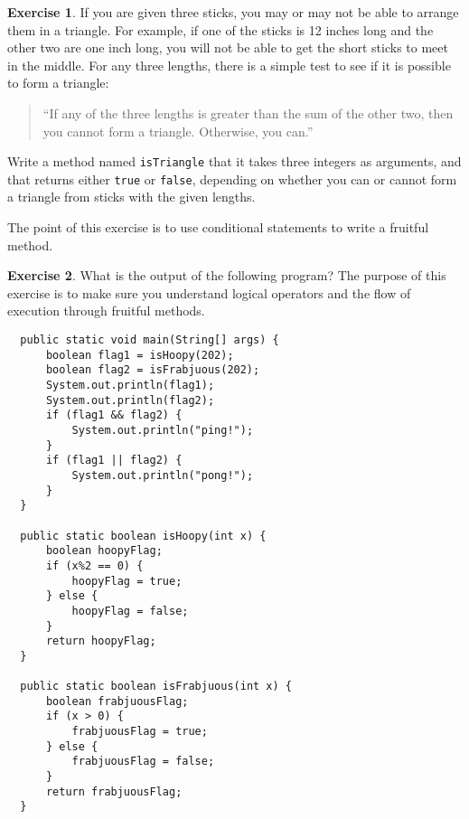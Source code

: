 \documentclass[12pt]{book}
\theoremstyle{definition}
\newtheorem{excz}{Exercise}[chapter]
\newenvironment{exercise}{\bigskip\begin{excz}\mbox{}}{\end{excz}}
\begin{document}
\begin{exercise}
If you are given three sticks, you may or may not be able to arrange
them in a triangle.  For example, if one of the sticks is 12 inches
long and the other two are one inch long, you will
not be able to get the short sticks to meet in the middle.  For any
three lengths, there is a simple test to see if it is possible to form
a triangle:

\begin{quotation}
``If any of the three lengths is greater than the sum of the other two,
then you cannot form a triangle.  Otherwise, you can.''
\end{quotation}

Write a method named {\tt isTriangle} that it takes three integers as
arguments, and that returns either {\tt true} or {\tt false},
depending on whether you can or cannot form a triangle from sticks
with the given lengths.

The point of this exercise is to use conditional statements to
write a fruitful method.

\end{exercise}


\begin{exercise}
What is the output of the following program?  The purpose of
this exercise is to make sure you understand logical operators
and the flow of execution through fruitful methods.

\begin{lstlisting}
  public static void main(String[] args) {
      boolean flag1 = isHoopy(202);
      boolean flag2 = isFrabjuous(202);
      System.out.println(flag1);
      System.out.println(flag2);
      if (flag1 && flag2) {
          System.out.println("ping!");
      }
      if (flag1 || flag2) {
          System.out.println("pong!");
      }
  }

  public static boolean isHoopy(int x) {
      boolean hoopyFlag;
      if (x%2 == 0) {
          hoopyFlag = true;
      } else {
          hoopyFlag = false;
      }
      return hoopyFlag;
  }

  public static boolean isFrabjuous(int x) {
      boolean frabjuousFlag;
      if (x > 0) {
          frabjuousFlag = true;
      } else {
          frabjuousFlag = false;
      }
      return frabjuousFlag;
  }
\end{lstlisting}
\end{exercise}
\end{document}
